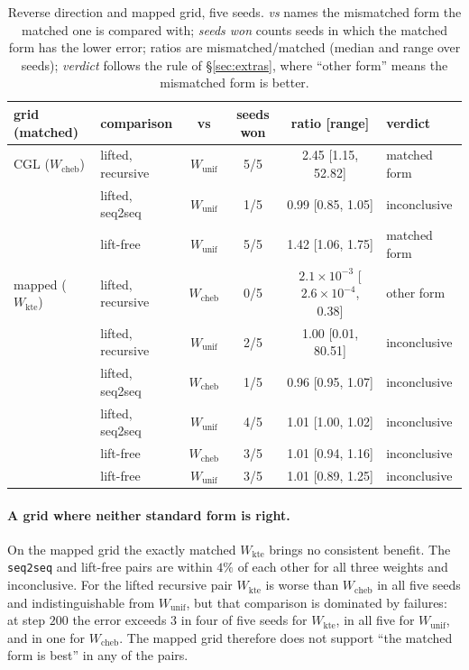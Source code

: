 \documentclass[11pt]{article}
\theoremstyle{definition}
\theoremstyle{remark}
\newcommand{\Wc}{W_{\mathrm{cheb}}}
\newcommand{\Wu}{W_{\mathrm{unif}}}
\begin{document}
\begin{table}[htbp]
\centering
\caption{Reverse direction and mapped grid, five seeds. \emph{vs} names the
mismatched form the matched one is compared with; \emph{seeds won} counts seeds
in which the matched form has the lower error; ratios are mismatched/matched
(median and range over seeds); \emph{verdict} follows the rule of
\S\ref{sec:extras}, where ``other form'' means the mismatched form is better.}
\label{tab:forms-grids}
\small
\begin{tabular}{@{}llcccl@{}}
\toprule
grid (matched) & comparison & vs & seeds won & ratio [range] & verdict \\
\midrule
CGL ($\Wc$) & lifted, recursive & $\Wu$ & 5/5 & 2.45 [1.15, 52.82] & matched form \\
 & lifted, seq2seq & $\Wu$ & 1/5 & 0.99 [0.85, 1.05] & inconclusive \\
 & lift-free & $\Wu$ & 5/5 & 1.42 [1.06, 1.75] & matched form \\
\midrule
mapped ($W_{\mathrm{kte}}$) & lifted, recursive & $\Wc$ & 0/5 & $2.1\times10^{-3}$ [$2.6\times10^{-4}$, 0.38] & other form \\
 & lifted, recursive & $\Wu$ & 2/5 & 1.00 [0.01, 80.51] & inconclusive \\
 & lifted, seq2seq & $\Wc$ & 1/5 & 0.96 [0.95, 1.07] & inconclusive \\
 & lifted, seq2seq & $\Wu$ & 4/5 & 1.01 [1.00, 1.02] & inconclusive \\
 & lift-free & $\Wc$ & 3/5 & 1.01 [0.94, 1.16] & inconclusive \\
 & lift-free & $\Wu$ & 3/5 & 1.01 [0.89, 1.25] & inconclusive \\
\bottomrule
\end{tabular}
\end{table}

\paragraph{A grid where neither standard form is right.} On the mapped grid the
exactly matched $W_{\mathrm{kte}}$ brings no consistent benefit. The
\texttt{seq2seq} and lift-free pairs are within $4\%$ of each other for all
three weights and inconclusive. For the lifted recursive pair $W_{\mathrm{kte}}$
is worse than $\Wc$ in all five seeds and indistinguishable from $\Wu$, but
that comparison is dominated by failures: at step $200$ the error exceeds $3$ in
four of five seeds for $W_{\mathrm{kte}}$, in all five for $\Wu$, and in one for
$\Wc$. The mapped grid therefore does not support ``the matched form is best'' in
any of the pairs.
\end{document}
